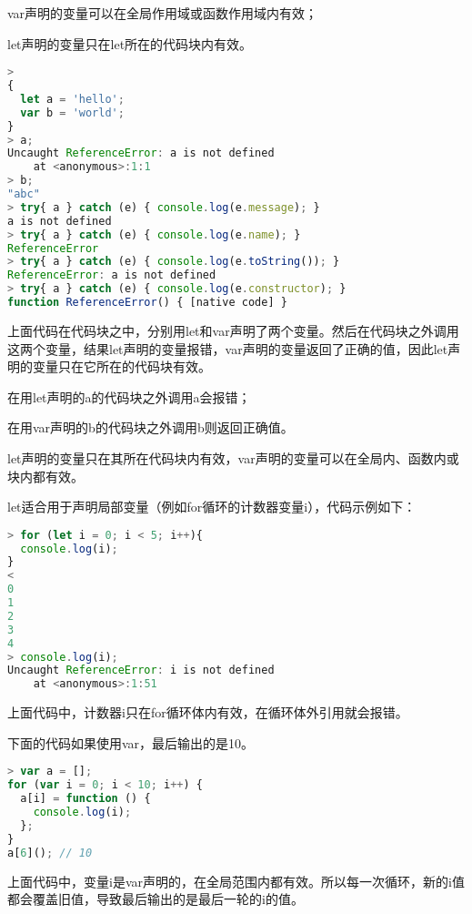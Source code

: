 \begin{compactitem}
\item var声明的变量可以在全局作用域或函数作用域内有效；
\item let声明的变量只在let所在的代码块内有效。
\end{compactitem}


\begin{lstlisting}[language=JavaScript]
> 
{
  let a = 'hello';  
  var b = 'world';
}
> a;
Uncaught ReferenceError: a is not defined
    at <anonymous>:1:1
> b;
"abc"
> try{ a } catch (e) { console.log(e.message); }
a is not defined
> try{ a } catch (e) { console.log(e.name); }
ReferenceError
> try{ a } catch (e) { console.log(e.toString()); }
ReferenceError: a is not defined
> try{ a } catch (e) { console.log(e.constructor); }
function ReferenceError() { [native code] }
\end{lstlisting}

上面代码在代码块之中，分别用let和var声明了两个变量。然后在代码块之外调用这两个变量，结果let声明的变量报错，var声明的变量返回了正确的值，因此let声明的变量只在它所在的代码块有效。

\begin{compactitem}
\item 在用let声明的a的代码块之外调用a会报错；
\item 在用var声明的b的代码块之外调用b则返回正确值。
\end{compactitem}

let声明的变量只在其所在代码块内有效，var声明的变量可以在全局内、函数内或块内都有效。

let适合用于声明局部变量（例如for循环的计数器变量i），代码示例如下：


\begin{lstlisting}[language=JavaScript]
> for (let i = 0; i < 5; i++){
  console.log(i);
}
< 
0
1
2
3
4
> console.log(i);
Uncaught ReferenceError: i is not defined
    at <anonymous>:1:51
\end{lstlisting}

上面代码中，计数器i只在for循环体内有效，在循环体外引用就会报错。

下面的代码如果使用var，最后输出的是10。

\begin{lstlisting}[language=JavaScript]
> var a = [];
for (var i = 0; i < 10; i++) {
  a[i] = function () {
    console.log(i);
  };
}
a[6](); // 10
\end{lstlisting}

上面代码中，变量i是var声明的，在全局范围内都有效。所以每一次循环，新的i值都会覆盖旧值，导致最后输出的是最后一轮的i的值。

